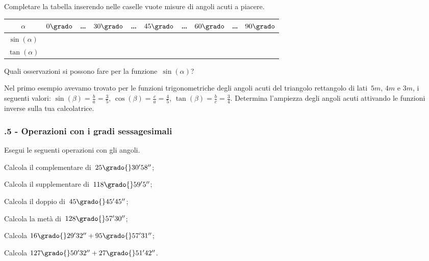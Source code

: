 \begin{esercizio}
\label{ese:G.4}
Completare la tabella inserendo nelle caselle vuote misure di angoli acuti a piacere.
\begin{center}
\begin{tabular}{cccccccccc}
\toprule
$\alpha$ & $0\grado$ & \ldots & $30\grado$ & \ldots & $45\grado$ & \ldots & $60\grado$ & \ldots & $90\grado$\\
\midrule
$\sin(\alpha)$ & & & & &  &  &  &  &  \\
$\tan(\alpha)$ & & &  &  &  &  &  &  &  \\
\bottomrule
\end{tabular}
\end{center}

Quali osservazioni si possono fare per la funzione~$\sin({\alpha})$?
\end{esercizio}

\begin{esercizio}
\label{ese:G.5}
Nel primo esempio avevamo trovato per le funzioni trigonometriche degli angoli acuti del triangolo rettangolo di lati~$5\unit{m}$,
$4\unit{m}$ e $3\unit{m}$, i seguenti valori:
$\sin(\beta)=\frac{b}{a}=\frac{3}{5}$, $\cos(\beta)=\frac{c}{a}=\frac{4}{5}$, $\tan(\beta)=\frac{b}{c}=\frac{3}{4}$.
Determina l'ampiezza degli angoli acuti attivando le funzioni inverse sulla tua calcolatrice.
\end{esercizio}

\subsubsection*{\thechapter.5 - Operazioni con i gradi sessagesimali}

\begin{esercizio}
\label{ese:G.6}
Esegui le seguenti operazioni con gli angoli.
\begin{multicols}{2}
\begin{enumeratea}
 \item Calcola il complementare di~$25\grado{}30' 58''$;
 \item Calcola il supplementare di~$118\grado{}59' 5''$;
 \item Calcola il doppio di~$45\grado{}45' 45''$;
 \item Calcola la metà di~$128\grado{}57' 30''$;
 \item Calcola $16\grado{}29' 32''+ 95\grado{}57' 31''$;
 \item Calcola $127\grado{}50' 32''+ 27\grado{}51' 42''$.
\end{enumeratea}
\end{multicols}
\end{esercizio}

